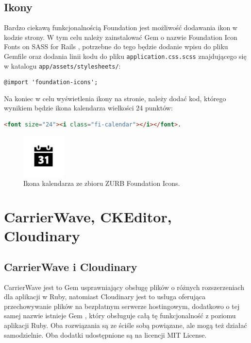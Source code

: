 \documentclass[openright]{xmgr}
\begin{document}
\subsection{Ikony}
Bardzo ciekawą funkcjonalnością Foundation jest możliwość dodawania ikon w kodzie strony. W tym celu należy zainstalować Gem o nazwie Foundation Icon Fonts on SASS for Rails \cite{icons}, potrzebne do tego będzie dodanie wpisu do pliku Gemfile oraz dodania linii kodu do pliku \texttt{application.css.scss} znajdującego się w katalogu \texttt{app/assets/stylesheets/}:
\begin{lstlisting}[language=ruby2, caption={Kod dołączający zbiór ikon Foundation Icons do aplikacji}]
@import 'foundation-icons';
\end{lstlisting}
Na koniec w celu wyświetlenia ikony na stronie, należy dodać kod, którego wynikiem będzie ikona kalendarza wielkości 24 punktów:
\begin{lstlisting}[language=html, caption={Przykładowa ikona ze zbioru ikon Foundation Icons}]
<font size="24"><i class="fi-calendar"></i></font>.
\end{lstlisting}

\begin{figure}[!tbh]
\centering
\includegraphics{fig/icon}
\caption{Ikona kalendarza ze zbioru ZURB Foundation Icons.}
\end{figure}

\newpage

\section{CarrierWave, CKEditor, Cloudinary}
\subsection{CarrierWave i Cloudinary}
CarrierWave \cite{carrierwave} jest to Gem usprawniający obsługę plików o różnych rozszerzeniach dla aplikacji w Ruby, natomiast Cloudinary jest to usługa oferująca przechowywanie plików na bezpłatnym serwerze hostingowym, dodatkowo o tej samej nazwie istnieje Gem \cite{cloudinary}, który obsługuje całą tę funkcjonalność z poziomu aplikacji Ruby. Oba rozwiązania są ze ściśle sobą powiązane, ale mogą też działać samodzielnie. Oba dodatki udostępnione są na licencji MIT License.
\end{document}
